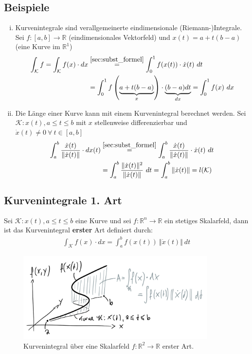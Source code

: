 \documentclass[11pt,a4paper]{book}
\newcommand {\R}	{\mathbb{R}}
\newcommand {\Rn}	{\mathbb{R}^n}
\newcommand {\Rzwei}	{\mathbb{R}^2}
\newcommand{\1}    	{\mathbbm{1}}
\newcommand{\Kurve}	{{\mathcal{K}}}
\begin{document}
\subsection{Beispiele}
\begin{enumerate}[(i)]
	\item Kurvenintegrale sind verallgemeinerte eindimensionale (Riemann-)Integrale. Sei \(f : [a,b] \rightarrow \R \) (eindimensionales Vektorfeld) und \(x(t) = a + t(b - a)\) (eine Kurve im \(\R^1\))
	\begin{align*}
		\int_\Kurve f = \int_\Kurve f(x) \cdot dx 
		&\stackrel{\ref{sec:subst_formel}}{=} 
		\int_0^1 f(x(t)) \cdot \dot{x}(t) ~dt \\
		&= 
		\int_0^1 f\left(\underbrace{a + t(b-a)}_{x}\right)\cdot \underbrace{(b-a) dt}_{dx} = \int_0^1 f(x) ~dx
	\end{align*}
	\item Die Länge einer Kurve kann mit einem Kurvenintegral berechnet werden. Sei \(\Kurve : x(t), a \leqslant t \leqslant b\) mit \(x\) stellenweise differenzierbar und \(\dot{x}(t) \neq 0 ~\forall~ t \in [a,b]\)
	\begin{align*}
		\int_a^b \frac{\dot{x}(t)}{\Vert \dot{x}(t) \Vert} \cdot dx(t) 
		&\stackrel{\ref{sec:subst_formel}}{=} 
		\int_a^b \frac{\dot{x}(t)}{\Vert \dot{x}(t) \Vert} \cdot \dot{x}(t) ~dt \\
		&= \int_a^b \frac{\Vert \dot{x}(t) \Vert^2}{\Vert \dot{x}(t) \Vert} ~dt = \int_a^b \Vert \dot{x}(t) \Vert = l(\Kurve)
	\end{align*}
\end{enumerate}

\subsection*{Kurvenintegrale 1. Art}
Sei \(\Kurve : x(t), a \leqslant t \leqslant b\) eine Kurve und sei \(f : \Rn \rightarrow \R\) ein stetiges Skalarfeld, dann ist das Kurvenintegral \textbf{erster} Art definiert durch:
\begin{align*}
	\int_\Kurve f(x) \cdot dx = \int_a^b f(x(t)) ~\Vert \dot{x}(t) \Vert ~dt
\end{align*}
\begin{figure}[H]
  	\centering
 	\includegraphics[width=10cm]{grafiken/Kurvenint_erster_Art.png}
  	\caption{Kurvenintegral über eine Skalarfeld \(f:\Rzwei \rightarrow \R\) erster Art.}
\end{figure}
\end{document}
